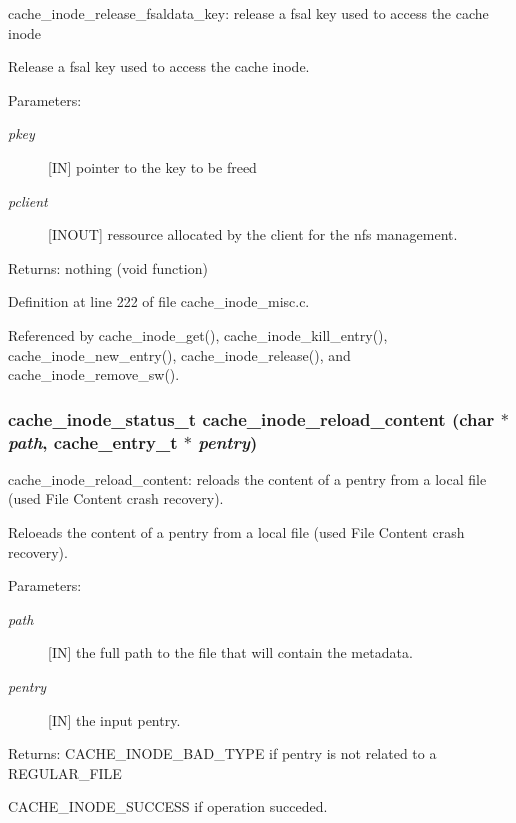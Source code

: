 cache\_\-inode\_\-release\_\-fsaldata\_\-key: release a fsal key used to access the cache inode

Release a fsal key used to access the cache inode.

\begin{Desc}
\item[Parameters:]
\begin{description}
\item[{\em pkey}][IN] pointer to the key to be freed \item[{\em pclient}][INOUT] ressource allocated by the client for the nfs management.\end{description}
\end{Desc}
\begin{Desc}
\item[Returns:]nothing (void function) \end{Desc}


Definition at line 222 of file cache\_\-inode\_\-misc.c.

Referenced by cache\_\-inode\_\-get(), cache\_\-inode\_\-kill\_\-entry(), cache\_\-inode\_\-new\_\-entry(), cache\_\-inode\_\-release(), and cache\_\-inode\_\-remove\_\-sw().
\subsubsection{\setlength{\rightskip}{0pt plus 5cm}cache\_\-inode\_\-status\_\-t cache\_\-inode\_\-reload\_\-content (char $\ast$ {\em path}, cache\_\-entry\_\-t $\ast$ {\em pentry})}\label{cache__inode__misc_8c_a17}


cache\_\-inode\_\-reload\_\-content: reloads the content of a pentry from a local file (used File Content crash recovery).

Reloeads the content of a pentry from a local file (used File Content crash recovery).

\begin{Desc}
\item[Parameters:]
\begin{description}
\item[{\em path}][IN] the full path to the file that will contain the metadata. \item[{\em pentry}][IN] the input pentry.\end{description}
\end{Desc}
\begin{Desc}
\item[Returns:]CACHE\_\-INODE\_\-BAD\_\-TYPE if pentry is not related to a REGULAR\_\-FILE \par
 

CACHE\_\-INODE\_\-SUCCESS if operation succeded. \end{Desc}


